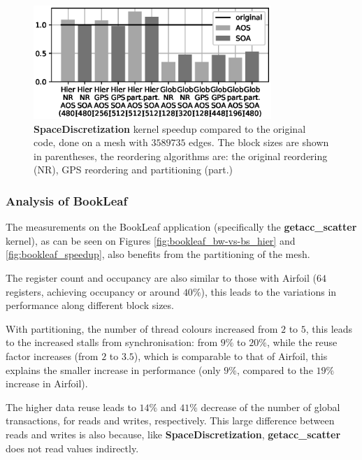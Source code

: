 \begin{figure}[Htbp]
  \centering
  \includegraphics[width=9cm]{fig/volna_speedup.eps}
  \caption{\textbf{SpaceDiscretization} kernel speedup compared to the original
  code, done on a mesh with $3589735$ edges. The block sizes are shown in
  parentheses, the reordering algorithms are: the original reordering (NR), GPS
  reordering and partitioning (part.)}
  \label{fig:volna_speedup}
\end{figure}

\subsubsection{Analysis of BookLeaf}

The measurements on the BookLeaf application (specifically the
\textbf{getacc\_scatter} kernel), as can be seen on Figures
\ref{fig:bookleaf_bw-vs-bs_hier} and \ref{fig:bookleaf_speedup}, also benefits
from the partitioning of the mesh.

The register count and occupancy are also similar to those with Airfoil ($64$
registers, achieving occupancy or around $40\%$), this leads to the variations
in performance along different block sizes.

With partitioning, the number of thread colours increased from $2$ to $5$, this
leads to the increased stalls from synchronisation: from $9\%$ to $20\%$, while
the reuse factor increases (from $2$ to $3.5$), which is comparable to that of
Airfoil, this explains the smaller increase in performance (only $9\%$, compared
to the $19\%$ increase in Airfoil).

The higher data reuse leads to $14\%$ and $41\%$ decrease of the number of
global transactions, for reads and writes, respectively. This large difference
between reads and writes is also because, like \textbf{SpaceDiscretization},
\textbf{getacc\_scatter} does not read values indirectly.




